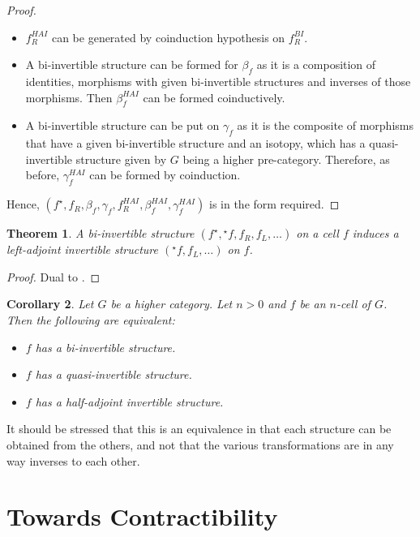 \documentclass[draft]{article}
\newtheorem{theorem}{Theorem} \newtheorem{prop}[theorem]{Proposition}
\newtheorem{cor}[theorem]{Corollary}
\newcommand{\linv}[1]{{}^\star\!#1} \newcommand{\rinv}[1]{#1^\star}
\begin{document}
\begin{proof}
\begin{itemize}
\begin{center}
    \end{center}
  \item \(f_R^{HAI}\) can be generated by coinduction hypothesis on
    \(f_R^{BI}\).
  \item A bi-invertible structure can be formed for \(\beta_f\) as it
    is a composition of identities, morphisms with given bi-invertible
    structures and inverses of those morphisms. Then \(\beta_f^{HAI}\)
    can be formed coinductively.
  \item A bi-invertible structure can be put on \(\gamma_f\) as it is
    the composite of morphisms that have a given bi-invertible
    structure and an isotopy, which has a quasi-invertible structure
    given by \(G\) being a higher pre-category. Therefore, as before,
    \(\gamma_f^{HAI}\) can be formed by coinduction.
  \end{itemize}
  Hence, \((\rinv f, f_R, \beta_f, \gamma_f, f_R^{HAI},
  \beta_f^{HAI}, \gamma_f^{HAI})\) is in the form required.
\end{proof}

\begin{theorem}
  A bi-invertible structure \((\rinv f, \linv f, f_R, f_L, \dots)\) on
  a cell \(f\) induces a left-adjoint invertible structure \((\linv f,
  f_L, \dots)\) on \(f\).
\end{theorem}
\begin{proof}
  Dual to .
\end{proof}

\begin{cor}\label{cor:equiv}
  Let \(G\) be a higher category. Let \(n > 0\) and \(f\) be an
  \(n\)-cell of \(G\). Then the following are equivalent:
  \begin{itemize}
  \item \(f\) has a bi-invertible structure.
  \item \(f\) has a quasi-invertible structure.
  \item \(f\) has a half-adjoint invertible structure.
  \end{itemize}
\end{cor}
It should be stressed that this is an equivalence in that each
structure can be obtained from the others, and not that the various
transformations are in any way inverses to each other.

\section{Towards Contractibility}\label{sec:contractibility}
\end{document}
